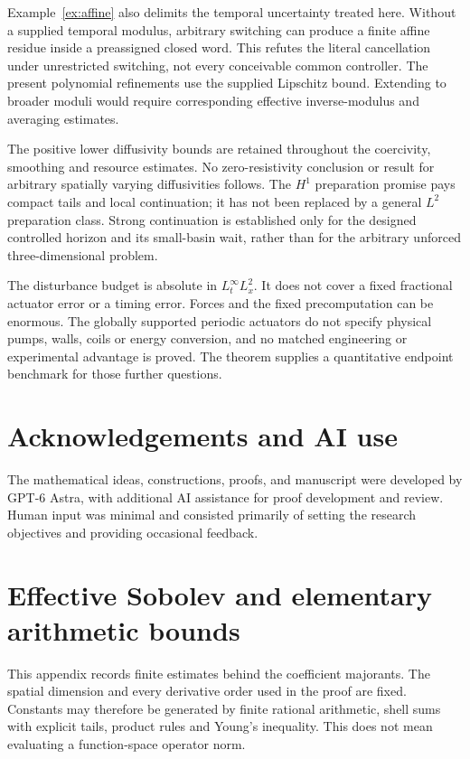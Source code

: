 \documentclass[11pt,a4paper]{amsart}
\theoremstyle{definition}
\theoremstyle{remark}
\numberwithin{equation}{section}
\begin{document}
Example~\ref{ex:affine} also delimits the temporal uncertainty treated here. Without a supplied temporal modulus, arbitrary switching can produce a finite affine residue inside a preassigned closed word. This refutes the literal cancellation under unrestricted switching, not every conceivable common controller. The present polynomial refinements use the supplied Lipschitz bound. Extending to broader moduli would require corresponding effective inverse-modulus and averaging estimates.

The positive lower diffusivity bounds are retained throughout the coercivity, smoothing and resource estimates. No zero-resistivity conclusion or result for arbitrary spatially varying diffusivities follows. The $H^1$ preparation promise pays compact tails and local continuation; it has not been replaced by a general $L^2$ preparation class. Strong continuation is established only for the designed controlled horizon and its small-basin wait, rather than for the arbitrary unforced three-dimensional problem.

The disturbance budget is absolute in $L^\infty_tL^2_x$. It does not cover a fixed fractional actuator error or a timing error. Forces and the fixed precomputation can be enormous. The globally supported periodic actuators do not specify physical pumps, walls, coils or energy conversion, and no matched engineering or experimental advantage is proved. The theorem supplies a quantitative endpoint benchmark for those further questions.


\section*{Acknowledgements and AI use}
The mathematical ideas, constructions, proofs, and manuscript were developed by GPT-6 Astra, with additional AI assistance for proof development and review. Human input was minimal and consisted primarily of setting the research objectives and providing occasional feedback.
\appendix

\section{Effective Sobolev and elementary arithmetic bounds}\label{app:estimates}
This appendix records finite estimates behind the coefficient majorants. The spatial dimension and every derivative order used in the proof are fixed. Constants may therefore be generated by finite rational arithmetic, shell sums with explicit tails, product rules and Young's inequality. This does not mean evaluating a function-space operator norm.
\end{document}
